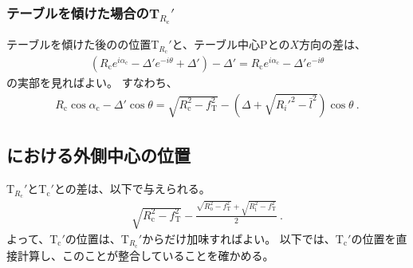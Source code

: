 \subsubsection{テーブルを傾けた場合のT\texorpdfstring{$_{R_\mathrm c}'$}{Rc'}}
テーブルを傾けた後の\TopCurvatureCenter の位置T$_{R_\mathrm c}'$と、テーブル中心Pとの$X$方向の差は、
\begin{align*}
  \left(R_\mathrm ce^{i\alpha_\mathrm c}-\Delta'e^{-i\theta}+\Delta'\right)-\Delta'
  = R_\mathrm ce^{i\alpha_\mathrm c}-\Delta'e^{-i\theta}
\end{align*}
の実部を見ればよい。
すなわち、
\begin{align}
  \label{eq:tableTRc}
  R_\mathrm c\cos\alpha_\mathrm c-\Delta'\cos\theta
  = \sqrt{R_\mathrm c^2-f_\mathrm T^2}-\left(\Delta+\sqrt{R_i'^2-\bar l^2}\right)\cos\theta~.
\end{align}


\clearpage
\subsection{\TopEndFace における外側中心の位置}
\TopCurvatureCenter T$_{R_\mathrm c}'$と\TopODCenter T$_\mathrm c'$との差は、以下で与えられる。
\begin{align}
  \label{eq:TRc-Tc}
  \sqrt{R_\mathrm c^2-f_\mathrm T^2}
  -\frac{\sqrt{R_\mathrm o^2-f_\mathrm T^2}+\sqrt{R_\mathrm i^2-f_\mathrm T^2}}2\ .
\end{align}
よって、\TopODCenter T$_\mathrm c'$の位置は、\TopCurvatureCenter T$_{R_\mathrm c}'$からだけ加味すればよい。
以下では、\TopODCenter T$_\mathrm c'$の位置を直接計算し、このことが整合していることを確かめる。

